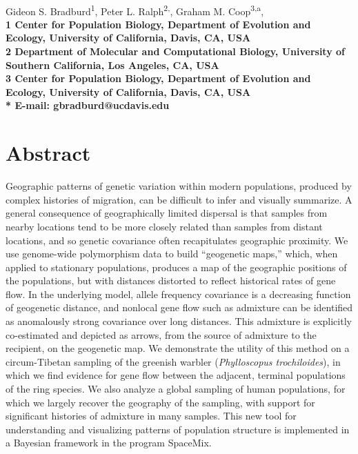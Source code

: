 \documentclass[10pt,letterpaper]{article}
\date{}
\begin{document}
\vspace*{0.35in}

\begin{flushleft}
{\Large
\textbf{}
}
\newline
\\
Gideon S. Bradburd\textsuperscript{1},
Peter L. Ralph\textsuperscript{2,\textpilcrow},
Graham M. Coop\textsuperscript{3,\textcurrency a},
\\
\bf{1} Center for Population Biology, Department of Evolution and Ecology, University of California, Davis, CA, USA
\\
\bf{2} Department of Molecular and Computational Biology, University of Southern California, Los Angeles, CA, USA
\\
\bf{3} Center for Population Biology, Department of Evolution and Ecology, University of California, Davis, CA, USA
\\

% 
%

* E-mail: gbradburd@ucdavis.edu
\end{flushleft}
\section*{Abstract}
Geographic patterns of genetic variation within modern populations, 
produced by complex histories of migration, 
can be difficult to infer and visually summarize. 
A general consequence of geographically limited dispersal 
is that samples from nearby locations tend to be more closely related than samples from distant locations, 
and so genetic covariance often recapitulates geographic proximity.  
We use genome-wide polymorphism data to build ``geogenetic maps,'' 
which, when applied to stationary populations, 
produces a map of the geographic positions of the populations, 
but with distances distorted to reflect historical rates of gene flow.  
In the underlying model, allele frequency covariance is a decreasing function of geogenetic distance, 
and nonlocal gene flow such as admixture can be identified as anomalously strong covariance over long distances.  
This admixture is explicitly co-estimated and depicted as arrows, 
from the source of admixture to the recipient, on the geogenetic map.  
We demonstrate the utility of this method on a circum-Tibetan sampling of the greenish warbler (\textit{Phylloscopus trochiloides}), 
in which we find evidence for gene flow between the adjacent, terminal populations of the ring species. 
We also analyze a global sampling of human populations, for which we largely recover the geography of the sampling, 
with support for significant histories of admixture in many samples.  
This new tool for understanding and visualizing patterns of population structure 
is implemented in a Bayesian framework in the program SpaceMix.
\end{document}
